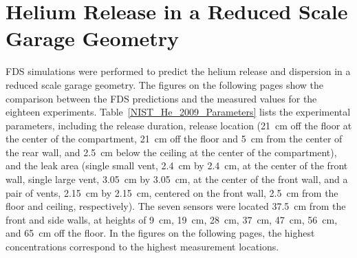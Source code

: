 \clearpage

\section{Helium Release in a Reduced Scale Garage Geometry}
\label{Species Concentration}

FDS simulations were performed to predict the helium release and dispersion in a reduced scale garage geometry. The figures on the following pages show the comparison between the FDS predictions and the measured values for the eighteen experiments. Table~\ref{NIST_He_2009_Parameters} lists the experimental parameters, including the release duration, release location (21~cm off the floor at the center of the compartment, 21~cm off the floor and 5~cm from the center of the rear wall, and 2.5~cm below the ceiling at the center of the compartment), and the leak area (single small vent, 2.4~cm by 2.4~cm, at the center of the front wall, single large vent, 3.05~cm by 3.05~cm, at the center of the front wall, and a pair of vents, 2.15~cm by 2.15~cm, centered on the front wall, 2.5~cm from the floor and ceiling, respectively). The seven sensors were located 37.5~cm from the front and side walls, at heights of 9~cm, 19~cm, 28~cm, 37~cm, 47~cm, 56~cm, and 65~cm off the floor. In the figures on the following pages, the highest concentrations correspond to the highest measurement locations.

